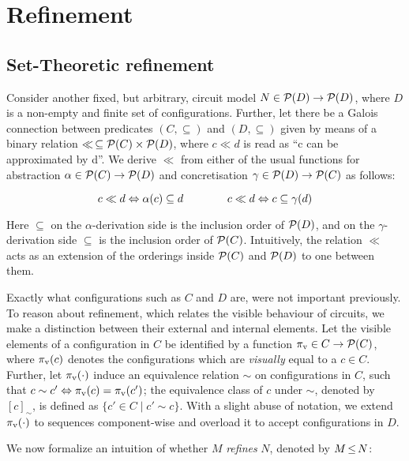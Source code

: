 \section{Refinement}

\subsection{Set-Theoretic refinement}

Consider another fixed, but arbitrary, circuit model $N \in \mathcal{P}(D) \rightarrow \mathcal{P}(D)$, where $D$ is a non-empty and finite set of configurations. Further, let there be a Galois connection between predicates $(C, \subseteq)$ and $(D, \subseteq)$ given by means of a binary relation $\ll \, \subseteq \mathcal{P}(C) \times \mathcal{P}(D)$, where $c \ll d$ is read as ``c can be approximated by d''. We derive $\ll$ from either of the usual functions for abstraction $\alpha \in \mathcal{P}(C) \rightarrow \mathcal{P}(D)$ and concretisation $\gamma \in \mathcal{P}(D) \rightarrow \mathcal{P}(C)$ as follows:

\begin{equation*}
c \ll d \Leftrightarrow \alpha(c) \subseteq d \quad\quad\quad\quad c \ll d \Leftrightarrow c \subseteq \gamma(d)
\end{equation*}

\noindent Here $\subseteq$ on the $\alpha$-derivation side is the inclusion order of $\mathcal{P}(D)$, and on the $\gamma$-derivation side $\subseteq$ is the inclusion order of $\mathcal{P}(C)$. Intuitively, the relation $\ll$ acts as an extension of the orderings inside $\mathcal{P}(C)$ and $\mathcal{P}(D)$ to one between them.

Exactly what configurations such as $C$ and $D$ are, were not important previously. To reason about refinement, which relates the visible behaviour of circuits, we make a distinction between their external and internal elements. Let the visible elements of a configuration in $C$ be identified by a function $\pi_{\textrm{v}} \in C \rightarrow \mathcal{P}(C)$, where $\pi_{\textrm{v}}(c)$ denotes the configurations which are \textit{visually} equal to a $c \in C$. Further, let $\pi_{\textrm{v}}(\cdot)$ induce an equivalence relation $\sim$ on configurations in $C$, such that $c \sim c' \Leftrightarrow \pi_{\textrm{v}}(c) = \pi_{\textrm{v}}(c')$; the equivalence class of $c$ under $\sim$, denoted by $[c]_{\sim}$, is defined as $\{ c' \in C \mid c' \sim c \}$. With a slight abuse of notation, we extend $\pi_{\textrm{v}}(\cdot)$ to sequences component-wise and overload it to accept configurations in $D$.

We now formalize an intuition of whether $M$ \textit{refines} $N$, denoted by $M \operatorname{\leq} N$:

